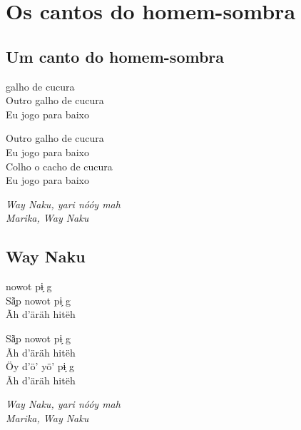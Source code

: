 
\part{Os cantos do homem-sombra}

\openany

{\pagecolor{black}
\color{white}
\chapter*{Um canto do homem-sombra}

 galho de cucura\\
Outro galho de cucura\\
Eu jogo para baixo

\bigskip

\noindent Outro galho de cucura\\
Eu jogo para baixo\\
Colho o cacho de cucura\\
Eu jogo para baixo

\bigskip

\noindent \textit{Way Naku, yari nóóy mah\\
Marika, Way Naku}

\chapter*{Way Naku}

 nowot pɨ̗ g\\
Sã̗p nowot pɨ̗ g\\
Ãh d’äräh hitëh

\bigskip

\noindent Sã̗p nowot pɨ̗ g\\
Ãh d’äräh hitëh\\
Öy d’ö’ yö’ pɨ̗ g\\
Ãh d’äräh hitëh

\bigskip

\noindent \textit{Way Naku, yari nóóy mah\\
Marika, Way Naku}
\afterpage{\nopagecolor}}

\chapter*{}
\thispagestyle{empty}

